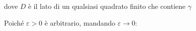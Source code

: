 \documentclass[preview]{standalone}
\begin{document}
\begin{center}
dove $D$ è il lato di un qualsiasi quadrato finito che contiene $\gamma$ \\Poiché $\varepsilon > 0$ è arbitrario, mandando $\varepsilon \to 0$:
\end{center}
\end{document}
